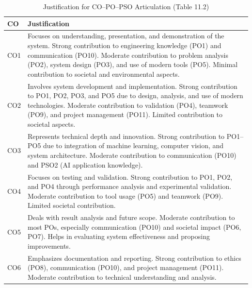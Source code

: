 \documentclass[12pt,a4paper]{report}
\begin{document}
\begin{table}[h!]
\centering
\caption{Justification for CO–PO–PSO Articulation (Table 11.2)}
\renewcommand{\arraystretch}{1.4}
\small
\begin{tabularx}{\textwidth}{|p{2cm}|X|}
\hline
\textbf{CO} & \textbf{Justification} \\
\hline

CO1 & Focuses on understanding, presentation, and demonstration of the system. Strong contribution to engineering knowledge (PO1) and communication (PO10). Moderate contribution to problem analysis (PO2), system design (PO3), and use of modern tools (PO5). Minimal contribution to societal and environmental aspects. \\
\hline

CO2 & Involves system development and implementation. Strong contribution to PO1, PO2, PO3, and PO5 due to design, analysis, and use of modern technologies. Moderate contribution to validation (PO4), teamwork (PO9), and project management (PO11). Limited contribution to societal aspects. \\
\hline

CO3 & Represents technical depth and innovation. Strong contribution to PO1–PO5 due to integration of machine learning, computer vision, and system architecture. Moderate contribution to communication (PO10) and PSO2 (AI application knowledge). \\
\hline

CO4 & Focuses on testing and validation. Strong contribution to PO1, PO2, and PO4 through performance analysis and experimental validation. Moderate contribution to tool usage (PO5) and teamwork (PO9). Limited societal contribution. \\
\hline

CO5 & Deals with result analysis and future scope. Moderate contribution to most POs, especially communication (PO10) and societal impact (PO6, PO7). Helps in evaluating system effectiveness and proposing improvements. \\
\hline

CO6 & Emphasizes documentation and reporting. Strong contribution to ethics (PO8), communication (PO10), and project management (PO11). Moderate contribution to technical understanding and analysis. \\
\hline

\end{tabularx}
\end{table}

\vspace{0.5cm}
\end{document}
